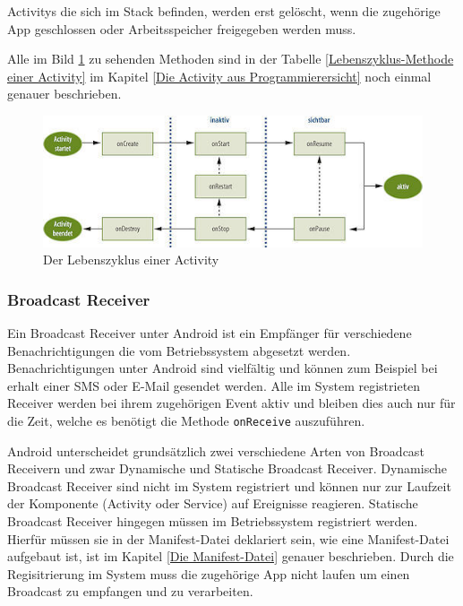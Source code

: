 Activitys die sich im Stack befinden, werden erst gel\"oscht, wenn die zugeh\"orige App geschlossen oder Arbeitsspeicher freigegeben werden muss. 

Alle im Bild \ref{ActivityLebenszyklus} zu sehenden Methoden sind in der Tabelle \ref{Lebenszyklus-Methode einer Activity} im Kapitel \ref{Die Activity aus Programmierersicht} noch einmal genauer beschrieben.

\begin{figure}[!ht]
\centering
\includegraphics[width=12cm]{Bilder/ActivityLifecycle}
\caption{Der Lebenszyklus einer Activity \cite{ActivityLifecycle}}
\label{ActivityLebenszyklus}
\centering
\end{figure}
\FloatBarrier


\subsubsection{Broadcast Receiver} \label{Broadcast Receiver aus Nutzersicht}
Ein Broadcast Receiver unter Android ist ein Empf\"anger f\"ur verschiedene Benachrichtigungen die vom Betriebssystem abgesetzt werden. Benachrichtigungen unter Android sind vielf\"altig und k\"onnen zum Beispiel bei erhalt einer SMS oder E-Mail gesendet werden. Alle im System registrieten Receiver werden bei ihrem zugeh\"origen Event aktiv und bleiben dies auch nur f\"ur die Zeit, welche es ben\"otigt die Methode \texttt{onReceive} auszuf\"uhren.

Android unterscheidet grunds\"atzlich zwei verschiedene Arten von Broadcast Receivern und zwar Dynamische und Statische Broadcast Receiver. Dynamische Broadcast Receiver sind nicht im System registriert und k\"onnen nur zur Laufzeit der Komponente (Activity oder Service) auf Ereignisse reagieren. Statische Broadcast Receiver hingegen m\"ussen im Betriebssystem registriert werden. Hierf\"ur m\"ussen sie in der Manifest-Datei deklariert sein, wie eine Manifest-Datei aufgebaut ist, ist im Kapitel \ref{Die Manifest-Datei} genauer beschrieben. Durch die Regisitrierung im System muss die zugeh\"orige App nicht laufen um einen Broadcast zu empfangen und zu verarbeiten.

